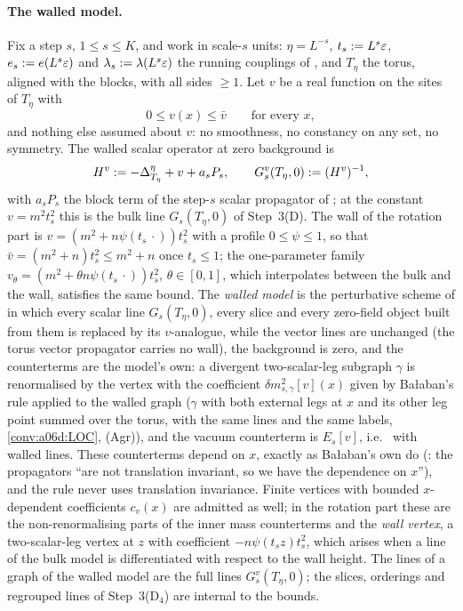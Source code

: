 
\paragraph{The walled model.} Fix a step $s$, $1\le s\le K$, and work in scale-$s$ units: $\eta=L^{-s}$, $t_s:= L^s\varepsilon$, $e_s:= e(L^s\varepsilon)$ and $\lambda_s:=\lambda(L^s\varepsilon)$ the running couplings of \cite[(1.33)]{Ba3}, and $T_\eta$ the torus, aligned with the blocks, with all sides $\ge1$. Let $v$ be a real function on the sites of $T_\eta$ with
\[
0\le v(x)\le\bar v\qquad\text{for every }x,
\]
and nothing else assumed about $v$: no smoothness, no constancy on any set, no symmetry. The walled scalar operator at zero background is
\[
H^v:=-\Delta^\eta_{T_\eta}+v+a_sP_s,\qquad G^v_s(T_\eta,0):=(H^v)^{-1},
\]
with $a_sP_s$ the block term of the step-$s$ scalar propagator of \cite{Ba1}; at the constant $v=m^2t_s^2$ this is the bulk line $G_s(T_\eta,0)$ of Step~3(D). The wall of the rotation part is $v=(m^2+n\psi(t_s\,\cdot))t_s^2$ with a profile $0\le\psi\le1$, so that $\bar v=(m^2+n)t_s^2\le m^2+n$ once $t_s\le1$; the one-parameter family $v_\theta=(m^2+\theta n\psi(t_s\,\cdot))t_s^2$, $\theta\in[0,1]$, which interpolates between the bulk and the wall, satisfies the same bound. The \emph{walled model} is the perturbative scheme of \cite[Sect.~1]{Ba3} in which every scalar line $G_s(T_\eta,0)$, every slice \cite[(2.6)]{Ba3} and every zero-field object built from them is replaced by its $v$-analogue, while the vector lines are unchanged (the torus vector propagator carries no wall), the background is zero, and the counterterms are the model's own: a divergent two-scalar-leg subgraph $\gamma$ is renormalised by the vertex \cite[(1.7)]{Ba3} with the coefficient $\delta m^2_{s,\gamma}[v](x)$ given by Ba{\l}aban's rule \cite[p.~417]{Ba3} applied to the walled graph ($\gamma$ with both external legs at $x$ and its other leg point summed over the torus, with the same lines and the same labels, \cref{conv:a06d:LOC}, (Agr)), and the vacuum counterterm is $E_s[v]$, i.e.\ \cite[(1.24)]{Ba3} with walled lines. These counterterms depend on $x$, exactly as Ba{\l}aban's own do (\cite[p.~418]{Ba3}: the propagators ``are not translation invariant, so we have the dependence on $x$''), and the rule never uses translation invariance. Finite \cite[(1.7)]{Ba3} vertices with bounded $x$-dependent coefficients $c_v(x)$ are admitted as well; in the rotation part these are the non-renormalising parts of the inner mass counterterms and the \emph{wall vertex}, a two-scalar-leg vertex at $z$ with coefficient $-n\psi(t_sz)t_s^2$, which arises when a line of the bulk model is differentiated with respect to the wall height. The lines of a graph of the walled model are the full lines $G^v_s(T_\eta,0)$; the slices, orderings and regrouped lines of Step~3(D$_4$) are internal to the bounds.

